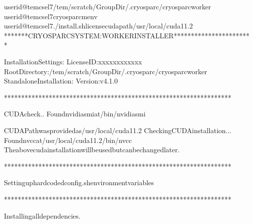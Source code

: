 \documentclass[a4paper,10pt,english]{sphinxmanual}
\begin{document}
\begin{sphinxVerbatim}[commandchars=\\\{\}]
userid@tem\PYGZhy{}cs\PYGZhy{}el7\PYGZdl{}\PYGZgt{}/tem/scratch/\PYGZlt{}GroupDir\PYGZgt{}/.cryosparc/cryosparc\PYGZus{}worker
userid@tem\PYGZhy{}cs\PYGZhy{}el7\PYGZdl{}\PYGZgt{}cryosparcmenv
userid@tem\PYGZhy{}cs\PYGZhy{}el7\PYGZdl{}\PYGZgt{}./install.sh\PYGZhy{}\PYGZhy{}license\PYGZhy{}\PYGZhy{}cudapath/usr/local/cuda\PYGZhy{}11.2
*******CRYOSPARCSYSTEM:WORKERINSTALLER***********************

InstallationSettings:
LicenseID:xxxxxxxxxxxx
RootDirectory:/tem/scratch/\PYGZlt{}GroupDir\PYGZgt{}/.cryosparc/cryosparc\PYGZus{}worker
StandaloneInstallation:
Version:v4.1.0

******************************************************************

CUDAcheck..
Foundnvidia\PYGZhy{}smiat/bin/nvidia\PYGZhy{}smi

CUDAPathwasprovidedas/usr/local/cuda\PYGZhy{}11.2
CheckingCUDAinstallation...
Foundnvccat/usr/local/cuda\PYGZhy{}11.2/bin/nvcc
Theabovecudainstallationwillbeusedbutcanbechangedlater.

******************************************************************

Settinguphard\PYGZhy{}codedconfig.shenvironmentvariables

******************************************************************

Installingalldependencies.


\end{sphinxVerbatim}
\end{document}
